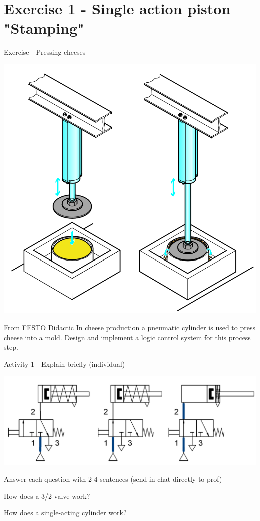 \documentclass[presentation,aspectratio=1610]{beamer}
\begin{document}
\section{Exercise 1 - Single action piston "Stamping"}
\label{sec:orgf0f9c34}
\begin{frame}[label={sec:org9815fc0}]{Exercise - Pressing cheeses}
\begin{center}
\includegraphics[width=0.4\linewidth]{../../figures/cheese-stamping.png}
\end{center}
{\tiny From FESTO Didactic}
In cheese production a pneumatic cylinder is used to press cheese into a mold. Design and implement a logic control system for this process step.
\end{frame}

\begin{frame}[label={sec:orge2d762c}]{Activity 1 - Explain briefly (individual)}
\begin{center}
\includegraphics[width=0.5\linewidth]{../../figures/valve-32-example.png}
\end{center}

Answer each question with 2-4 sentences (send in chat directly to prof)

\begin{block}{How does a 3/2 valve work?}
\end{block}
\begin{block}{How does a single-acting cylinder work?}
\end{block}
\end{frame}
\end{document}
